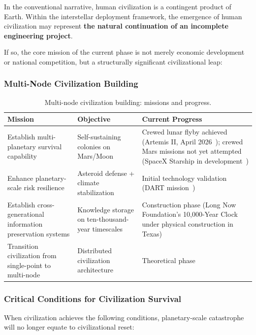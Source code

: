 \documentclass[aps,prd,twocolumn,superscriptaddress,nofootinbib]{revtex4-2}
\begin{document}
In the conventional narrative, human civilization is a contingent product of Earth. Within the interstellar deployment framework, the emergence of human civilization may represent \textbf{the natural continuation of an incomplete engineering project}.

If so, the core mission of the current phase is not merely economic development or national competition, but a structurally significant civilizational leap:

\subsubsection{Multi-Node Civilization Building}\label{sec:multi-node}

\begin{table}[htbp]
\caption{Multi-node civilization building: missions and progress.}
\label{tab:multi-node}
\footnotesize
\begin{tabular}{P{0.287\textwidth}P{0.262\textwidth}P{0.347\textwidth}}
\toprule
Mission & Objective & Current Progress \\
\midrule
Establish multi-planetary survival capability & Self-sustaining colonies on Mars/Moon & Crewed lunar flyby achieved (Artemis II, April 2026~\cite{NASA_Artemis,NASA_ArtemisII}); crewed Mars missions not yet attempted (SpaceX Starship in development~\cite{SpaceX_Mars}) \\
Enhance planetary-scale risk resilience & Asteroid defense + climate stabilization & Initial technology validation (DART mission~\cite{NASA_DART}) \\
Establish cross-generational information preservation systems & Knowledge storage on ten-thousand-year timescales & Construction phase (Long Now Foundation's 10,000-Year Clock~\cite{LongNow_Clock} under physical construction in Texas) \\
Transition civilization from single-point to multi-node & Distributed civilization architecture & Theoretical phase \\
\bottomrule
\end{tabular}
\end{table}

\subsubsection{Critical Conditions for Civilization Survival}\label{sec:critical-conditions}

When civilization achieves the following conditions, planetary-scale catastrophe will no longer equate to civilizational reset:
\end{document}
